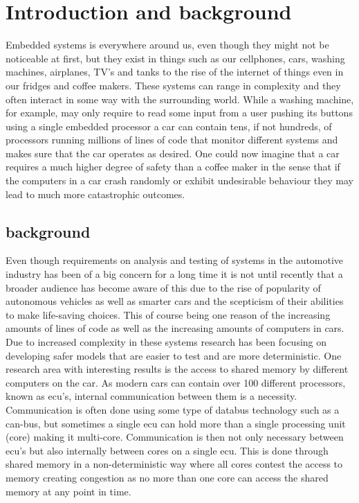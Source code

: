 \documentclass{kththesis}
\begin{document}
\tableofcontents

\mainmatter


\chapter{Introduction and background} 

Embedded systems is everywhere around us, even though they might not be noticeable at first,
but they exist in things such as our cellphones, cars, washing machines, airplanes, TV's and tanks
to the rise of the internet of things even in our fridges and coffee makers. These systems can range
in complexity and they often interact in some way with the surrounding world. While a washing
machine, for example, may only require to read some input from a user pushing its buttons using a
single embedded processor a car can contain tens, if not hundreds, of processors running millions of
lines of code that monitor different systems and makes sure that the car operates as
desired\parencite{doughty-white_million_nodate}. One could now imagine that a car requires a much
higher degree of safety than a coffee maker in the sense that if the computers in a car crash
randomly or exhibit undesirable behaviour they may lead to much more catastrophic outcomes.






\section{background}

Even though requirements on analysis and testing of systems in the automotive industry has been of a
big concern for a long time it is not until recently that a broader audience has become aware of
this due to the rise of popularity of autonomous vehicles as well as smarter cars and the scepticism
of their abilities to make life-saving choices. This of course being one reason of the increasing
amounts of lines of code as well as the increasing amounts of computers in cars. Due to increased
complexity in these systems research has been focusing on developing safer models that are easier to
test and are more deterministic. One research area with interesting results is the access to shared
memory by different computers on the car. As modern cars can contain over 100 different processors,
known as \acrshort{ecu}'s, internal communication between them is a necessity. Communication is
often done using some type of databus technology such as a \acrshort{can}-bus, but sometimes a single
\acrshort{ecu} can hold more than a single processing unit (core) making it multi-core.
Communication is then not only necessary between \acrshort{ecu}'s but also internally between cores
on a single \acrshort{ecu}. This is done through shared memory in a non-deterministic way where all
cores contest the access to memory creating congestion as no more than one core can access the
shared memory at any point in time. 
\end{document}
